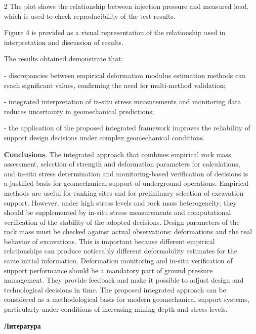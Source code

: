 \begin{multicols}{2}
The plot shows the relationship between injection pressure and measured
load, which is used to check reproducibility of the test results.

Figure 4 is provided as a visual representation of the relationship used
in interpretation and discussion of results.

The results obtained demonstrate that:

- discrepancies between empirical deformation modulus estimation methods
can reach significant values, confirming the need for multi-method
validation;

- integrated interpretation of in-situ stress measurements and
monitoring data reduces uncertainty in geomechanical predictions;

- the application of the proposed integrated framework improves the
reliability of support design decisions under complex geomechanical
conditions.

{\bfseries Conclusions}. The integrated approach that combines empirical
rock mass assessment, selection of strength and deformation parameters
for calculations, and in-situ stress determination and monitoring-based
verification of decisions is a justified basis for geomechanical support
of underground operations. Empirical methods are useful for ranking
sites and for preliminary selection of excavation support. However,
under high stress levels and rock mass heterogeneity, they should be
supplemented by in-situ stress measurements and computational
verification of the stability of the adopted decisions. Design
parameters of the rock mass must be checked against actual observations:
deformations and the real behavior of excavations. This is important
because different empirical relationships can produce noticeably
different deformability estimates for the same initial information.
Deformation monitoring and in-situ verification of support performance
should be a mandatory part of ground pressure management. They provide
feedback and make it possible to adjust design and technological
decisions in time. The proposed integrated approach can be considered as
a methodological basis for modern geomechanical support systems,
particularly under conditions of increasing mining depth and stress
levels.
\end{multicols}

\begin{center}
{\bfseries Литература}
\end{center}

